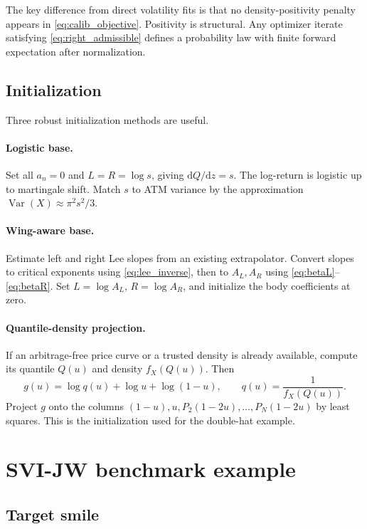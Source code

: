 \documentclass[11pt]{article}
\newcommand{\dd}{\mathrm{d}}
\newcommand{\1}{\mathbf{1}}
\begin{document}
The key difference from direct volatility fits is that no density-positivity penalty appears in \eqref{eq:calib_objective}.  Positivity is structural.  Any optimizer iterate satisfying \eqref{eq:right_admissible} defines a probability law with finite forward expectation after normalization.

\subsection{Initialization}

Three robust initialization methods are useful.

\paragraph{Logistic base.}  Set all $a_n=0$ and $L=R=\log s$, giving $\dd Q/\dd z=s$.  The log-return is logistic up to martingale shift.  Match $s$ to ATM variance by the approximation $\operatorname{Var}(X)\approx\pi^2s^2/3$.

\paragraph{Wing-aware base.}  Estimate left and right Lee slopes from an existing extrapolator.  Convert slopes to critical exponents using \eqref{eq:lee_inverse}, then to $A_L,A_R$ using \eqref{eq:betaL}--\eqref{eq:betaR}.  Set $L=\log A_L$, $R=\log A_R$, and initialize the body coefficients at zero.

\paragraph{Quantile-density projection.}  If an arbitrage-free price curve or a trusted density is already available, compute its quantile $Q(u)$ and density $f_X(Q(u))$.  Then
\begin{equation}
    g(u)=\log q(u)+\log u+\log(1-u),
    \qquad q(u)=\frac{1}{f_X(Q(u))}.
\end{equation}
Project $g$ onto the columns $(1-u),u,P_2(1-2u),\ldots,P_N(1-2u)$ by least squares.  This is the initialization used for the double-hat example.

\section{SVI-JW benchmark example}

\subsection{Target smile}
\end{document}
